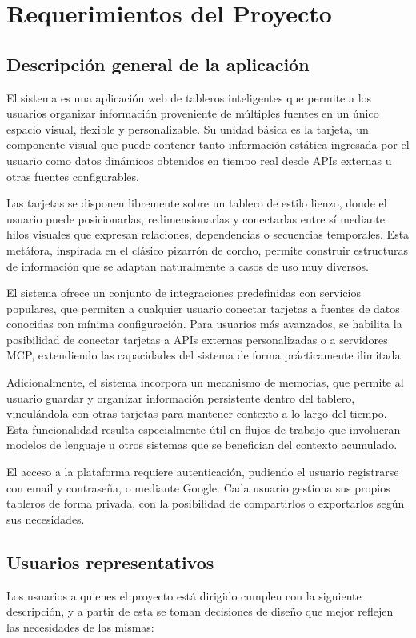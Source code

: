 \chapter{Requerimientos del Proyecto}

\section{Descripción general de la aplicación}
El sistema es una aplicación web de tableros inteligentes que permite a los usuarios organizar información proveniente de múltiples fuentes en un único espacio visual, flexible y personalizable. Su unidad básica es la tarjeta, un componente visual que puede contener tanto información estática ingresada por el usuario como datos dinámicos obtenidos en tiempo real desde APIs externas u otras fuentes configurables.

Las tarjetas se disponen libremente sobre un tablero de estilo lienzo, donde el usuario puede posicionarlas, redimensionarlas y conectarlas entre sí mediante hilos visuales que expresan relaciones, dependencias o secuencias temporales. Esta metáfora, inspirada en el clásico pizarrón de corcho, permite construir estructuras de información que se adaptan naturalmente a casos de uso muy diversos.

El sistema ofrece un conjunto de integraciones predefinidas con servicios populares, que permiten a cualquier usuario conectar tarjetas a fuentes de datos conocidas con mínima configuración. Para usuarios más avanzados, se habilita la posibilidad de conectar tarjetas a APIs externas personalizadas o a servidores MCP, extendiendo las capacidades del sistema de forma prácticamente ilimitada.

Adicionalmente, el sistema incorpora un mecanismo de memorias, que permite al usuario guardar y organizar información persistente dentro del tablero, vinculándola con otras tarjetas para mantener contexto a lo largo del tiempo. Esta funcionalidad resulta especialmente útil en flujos de trabajo que involucran modelos de lenguaje u otros sistemas que se benefician del contexto acumulado.

El acceso a la plataforma requiere autenticación, pudiendo el usuario registrarse con email y contraseña, o mediante Google. Cada usuario gestiona sus propios tableros de forma privada, con la posibilidad de compartirlos o exportarlos según sus necesidades.

\section{Usuarios representativos}
Los usuarios a quienes el proyecto está dirigido cumplen con la siguiente descripción, y a partir de esta se toman decisiones de diseño que mejor reflejen las necesidades de las mismas:

